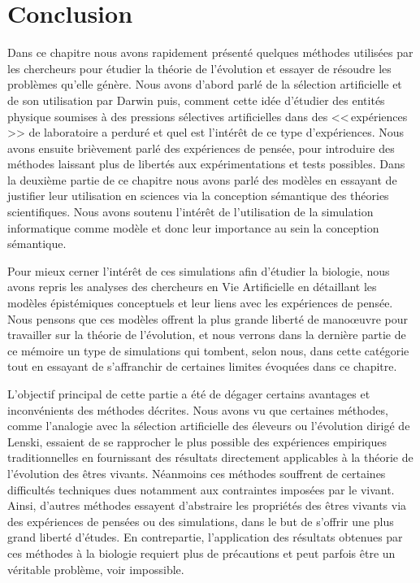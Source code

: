 \section{Conclusion}
Dans ce chapitre nous avons rapidement présenté quelques méthodes utilisées par les chercheurs pour étudier la théorie de l'évolution et essayer de résoudre les problèmes qu'elle génère. Nous avons d'abord parlé de la sélection artificielle et de son utilisation par Darwin puis, comment cette idée d'étudier des entités physique soumises à des pressions sélectives artificielles dans des <<\,expériences\,>> de laboratoire a perduré et quel est l'intérêt de ce type d'expériences. Nous avons ensuite brièvement parlé des expériences de pensée, pour introduire des méthodes laissant plus de libertés aux expérimentations et tests possibles.
Dans la deuxième partie de ce chapitre nous avons parlé des modèles en essayant de justifier leur utilisation en sciences via la conception sémantique des théories scientifiques. Nous avons soutenu l'intérêt de l'utilisation de la simulation informatique comme modèle et donc leur importance au sein la conception sémantique. 

Pour mieux cerner l'intérêt de ces simulations afin d'étudier la biologie, nous avons repris les analyses des chercheurs en Vie Artificielle en détaillant les modèles épistémiques conceptuels et leur liens avec les expériences de pensée. Nous pensons que ces modèles offrent la plus grande liberté de mano\oe uvre pour travailler sur la théorie de l'évolution, et nous verrons dans la dernière partie de ce mémoire un type de simulations qui tombent, selon nous, dans cette catégorie tout en essayant de s'affranchir de certaines limites évoquées dans ce chapitre.

L'objectif principal de cette partie a été de dégager certains avantages et inconvénients des méthodes décrites. Nous avons vu que certaines méthodes, comme l'analogie avec la sélection artificielle des éleveurs ou l'évolution dirigé de Lenski, essaient de se rapprocher le plus possible des expériences empiriques traditionnelles en fournissant des résultats directement applicables à la théorie de l'évolution des êtres vivants. Néanmoins ces méthodes souffrent de certaines difficultés techniques dues notamment aux contraintes imposées par le vivant. Ainsi, d'autres méthodes essayent d'abstraire les propriétés des êtres vivants via des expériences de pensées ou des simulations, dans le but de s'offrir une plus grand liberté d'études. En contrepartie, l'application des résultats obtenues par ces méthodes à la biologie requiert plus de précautions et peut parfois être un véritable problème, voir impossible.
